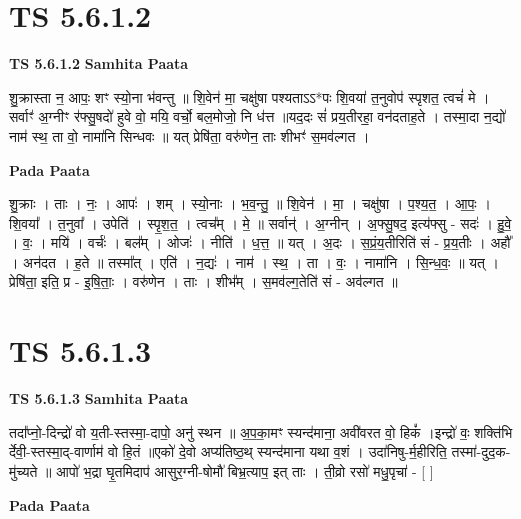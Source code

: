 \documentclass[17pt]{extarticle}
\begin{document}
\section{ TS 5.6.1.2 }

\textbf{TS 5.6.1.2 } \newline
\textbf{Samhita Paata} \newline

शु॒क्रास्ता न॒ आपः॒ शꣳ स्यो॒ना भ॑वन्तु ॥ शि॒वेन॑ मा॒ चक्षु॑षा पश्यताऽऽ*पः शि॒वया॑ त॒नुवोप॑ स्पृशत॒ त्वचं॑ मे ।सर्वाꣳ॑ अ॒ग्नीꣳ र॑फ्सु॒षदो॑ हुवे वो॒ मयि॒ वर्चो॒ बल॒मोजो॒ नि ध॑त्त ॥यद॒दः सं॑ प्रय॒॒तीरहा॒॒ वन॑दताह॒ते । तस्मा॒दा न॒द्यो॑ नाम॑ स्थ॒ ता वो॒ नामा॑नि सिन्धवः ॥ यत् प्रेषि॑ता॒ वरु॑णेन॒ ताः शीभꣳ॑ स॒मव॑ल्गत । \newline

\textbf{Pada Paata} \newline

शु॒क्राः । ताः । नः॒ । आपः॑ । शम् । स्यो॒नाः । भ॒व॒न्तु॒ ॥ शि॒वेन॑ । मा॒ । चक्षु॑षा । प॒श्य॒त॒ । आ॒पः॒ । शि॒वया᳚ । त॒नुवा᳚ । उपेति॑ । स्पृ॒श॒त॒ । त्वच᳚म् । मे॒ ॥ सर्वान्॑ । अ॒ग्नीन् । अ॒फ्सु॒षद॒ इत्य॑फ्सु - सदः॑ । हु॒वे॒ । वः॒ । मयि॑ । वर्चः॑ । बल᳚म् । ओजः॑ । नीति॑ । ध॒त्त॒ ॥ यत् । अ॒दः । स॒प्रं॒य॒तीरिति॑ सं - प्र॒य॒तीः । अहौ᳚ । अन॑दत । ह॒ते ॥ तस्मा᳚त् । एति॑ । न॒द्यः॑ । नाम॑ । स्थ॒ । ता । वः॒ । नामा॑नि । सि॒न्ध॒वः॒ ॥ यत् । प्रेषि॑ता॒ इति॒ प्र - इ॒षि॒ताः॒ । वरु॑णेन । ताः । शीभ᳚म् । स॒मव॑ल्ग॒तेति॑ सं - अव॑ल्गत ॥  \newline





\section{ TS 5.6.1.3 }

\textbf{TS 5.6.1.3 } \newline
\textbf{Samhita Paata} \newline

तदा᳚प्नो॒-दिन्द्रो॑ वो य॒ती-स्तस्मा॒-दापो॒ अनु॑ स्थन ॥ अ॒प॒का॒मꣳ स्यन्द॑माना॒ अवी॑वरत वो॒ हिकं᳚ ।इन्द्रो॑ वः॒ शक्ति॑भि र्देवी॒-स्तस्मा॒द्-वार्णाम॑ वो हि॒तं ॥एको॑ दे॒वो अप्य॑तिष्ठ॒थ् स्यन्द॑माना यथा व॒शं । उदा॑निषु-र्म॒हीरिति॒ तस्मा॑-दुद॒क-मु॑च्यते ॥ आपो॑ भ॒द्रा घृ॒तमिदाप॑ आसुर॒ग्नी-षोमौ॑ बिभ्र॒त्याप॒ इत् ताः । ती॒व्रो रसो॑ मधु॒पृचा॑ - [  ] \newline

\textbf{Pada Paata} \newline
\end{document}

